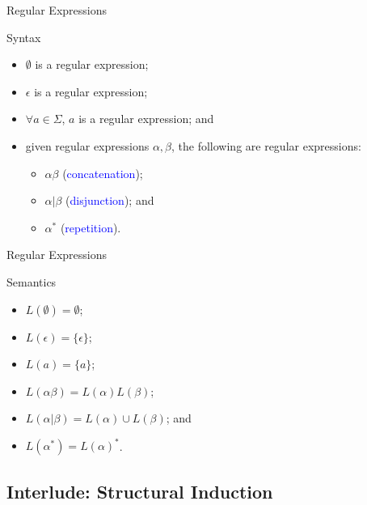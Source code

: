 \documentclass{beamer}
\def\b{\textcolor{blue}}
\begin{document}
\begin{frame}{Regular Expressions}
    \begin{block}{Syntax}
        \begin{itemize}
            \item $\boldsymbol{\emptyset}$ is a regular expression\pause;
            \item $\epsilon$ is a regular expression\pause;
            \item $\forall a \in \Sigma$, $a$ is a regular expression\pause; and
            \item given regular expressions $\alpha, \beta$, the following are regular expressions:\pause
                \begin{itemize}
                    \item $\alpha \beta$ (\b{concatenation})\pause;
                    \item $\alpha | \beta$ (\b{disjunction})\pause; and
                    \item $\alpha^*$ (\b{repetition}).
                \end{itemize}
        \end{itemize}
    \end{block}
\end{frame}

\begin{frame}{Regular Expressions}
    \begin{block}{Semantics}
        \begin{itemize}
            \item $L(\boldsymbol{\emptyset}) = \emptyset$\pause;
            \item $L(\epsilon) = \{\epsilon\}$\pause;
            \item $L(a) = \{a\}$\pause;
            \item $L(\alpha \beta) = L(\alpha) L(\beta)$\pause;
            \item $L(\alpha | \beta) = L(\alpha) \cup L(\beta)$\pause; and
            \item $L(\alpha^*) = L(\alpha)^*$.
        \end{itemize}
    \end{block}
\end{frame}

\subsection{Interlude: Structural Induction}
\end{document}
